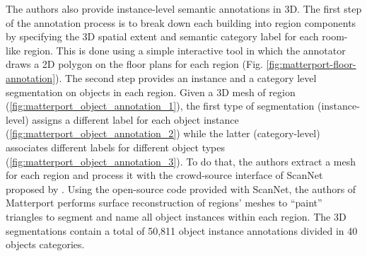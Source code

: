 The authors also provide instance-level semantic annotations in 3D. The first step of the annotation process is to break down each building into region components by specifying the 3D spatial extent and semantic category label for
each room-like region. This is done using a simple interactive tool in which the annotator draws a 2D polygon on the floor plans for each region (Fig. \ref{fig:matterport-floor-annotation}). The second step provides an instance and a category level segmentation on objects in each region. Given a 3D mesh of region (\ref{fig:matterport_object_annotation_1}), the first type of segmentation (instance-level) assigns a different label for each object instance (\ref{fig:matterport_object_annotation_2}) while the latter (category-level) associates different labels for different object types (\ref{fig:matterport_object_annotation_3}). To do that, the authors extract a mesh for each region and process it with the crowd-source interface of ScanNet  proposed by \citeauthor{scannet} \cite{scannet}. Using the open-source code provided with ScanNet, the authors of Matterport performs surface reconstruction of regions' meshes to ``paint'' triangles to segment and name all object instances
within each region. The 3D segmentations contain a total of 50,811 object
instance annotations divided in 40 objects categories.

